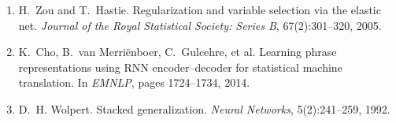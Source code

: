 \documentclass{mnnit}
\begin{document}
\begin{enumerate}
\item\label{ref:elasticnet} H.~Zou and T.~Hastie. Regularization and variable selection via the elastic net. \emph{Journal of the Royal Statistical Society: Series B}, 67(2):301--320, 2005.
\item\label{ref:gru} K.~Cho, B.~van Merri\"enboer, C.~Gulcehre, et al. Learning phrase representations using RNN encoder--decoder for statistical machine translation. In \emph{EMNLP}, pages 1724--1734, 2014.
\item\label{ref:stacking} D.~H. Wolpert. Stacked generalization. \emph{Neural Networks}, 5(2):241--259, 1992.
\end{enumerate}
\end{document}
